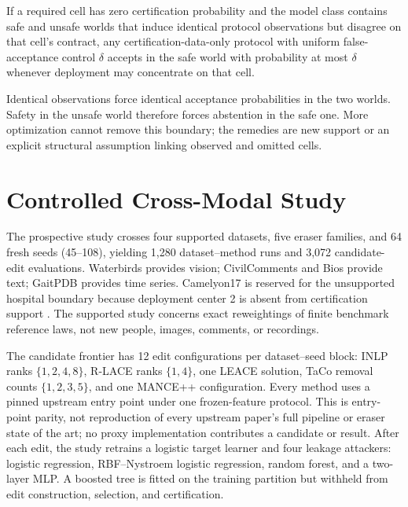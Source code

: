 \begin{theorem}
\label{iclr:thm:impossibility}
If a required cell has zero certification probability and the model class
contains safe and unsafe worlds that induce identical protocol observations but
disagree on that cell's contract, any certification-data-only protocol with uniform
false-acceptance control $\delta$ accepts in the safe world with probability at
most $\delta$ whenever deployment may concentrate on that cell.
\end{theorem}

Identical observations force identical acceptance probabilities in the two
worlds. Safety in the unsafe world therefore forces abstention in the safe one.
More optimization cannot remove this boundary; the remedies are new support or
an explicit structural assumption linking observed and omitted cells.

\section{Controlled Cross-Modal Study}
\label{iclr:sec:protocol}

The prospective study crosses four supported datasets, five eraser families,
and 64 fresh seeds (45--108), yielding 1,280 dataset--method runs and 3,072
candidate-edit evaluations. Waterbirds provides vision; CivilComments and Bios
provide text; GaitPDB provides time series. Camelyon17 is reserved for the
unsupported hospital boundary because deployment center 2 is absent from
certification support
\cite{koh2021wilds,sagawa2020groupdro,borkan2019civilcomments,dearteaga2019bios}.
The supported study concerns exact reweightings of finite benchmark reference
laws, not new people, images, comments, or recordings.

The candidate frontier has 12 edit configurations per dataset--seed block:
INLP ranks $\{1,2,4,8\}$, R-LACE ranks $\{1,4\}$, one LEACE solution, TaCo
removal counts $\{1,2,3,5\}$, and one MANCE++ configuration. Every method uses a
pinned upstream entry point under one frozen-feature protocol. This is entry-
point parity, not reproduction of every upstream paper's full pipeline or
eraser state of the art; no proxy implementation contributes a candidate or
result. After each edit, the study retrains a logistic target
learner and four leakage attackers:
logistic regression, RBF--Nystroem logistic regression, random forest, and a
two-layer MLP. A boosted tree is fitted on the training partition but withheld
from edit construction, selection, and certification.

